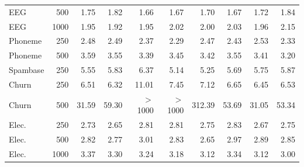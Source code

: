 \documentclass[pdflatex,sn-mathphys-num,iicol]{sn-jnl}
\theoremstyle{thmstyleone}
\theoremstyle{thmstyletwo}
\theoremstyle{thmstylethree}
\begin{document}
\begin{table}[t]
\begin{tabular}{lrrrrrrrrr}
EEG & 500 & 1.75 & 1.82 & 1.66 & 1.67 & 1.70 & 1.67 & 1.72 & 1.84 \\
EEG & 1000 & 1.95 & 1.92 & 1.95 & 2.02 & 2.00 & 2.03 & 1.96 & 2.15 \\
Phoneme & 250 & 2.48 & 2.49 & 2.37 & 2.29 & 2.47 & 2.43 & 2.53 & 2.33 \\
Phoneme & 500 & 3.59 & 3.55 & 3.39 & 3.45 & 3.42 & 3.55 & 3.41 & 3.20 \\
Spambase & 250 & 5.55 & 5.83 & 6.37 & 5.14 & 5.25 & 5.69 & 5.75 & 5.87 \\
Churn & 250 & 6.51 & 6.32 & 11.01 & 7.45 & 7.12 & 6.65 & 6.45 & 6.53 \\
Churn & 500 & 31.59 & 59.30 & $>$1000 & $>$1000 & 312.39 & 53.69 & 31.05 & 53.34 \\
Elec. & 250 & 2.73 & 2.65 & 2.81 & 2.81 & 2.75 & 2.83 & 2.67 & 2.75 \\
Elec. & 500 & 2.82 & 2.77 & 3.01 & 2.83 & 2.65 & 2.97 & 2.89 & 2.85 \\
Elec. & 1000 & 3.37 & 3.30 & 3.24 & 3.18 & 3.12 & 3.34 & 3.12 & 3.00 \\
\bottomrule
\end{tabular}

\end{table}
\end{document}

